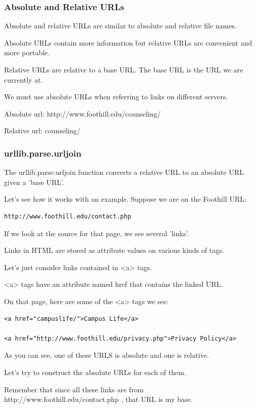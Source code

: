\documentclass{article}
\begin{document}
\subsubsection{Absolute and Relative URLs}
Absolute and relative URLs are similar to absolute and relative file names.

Absolute URLs contain more information but relative URLs are convenient and more portable.

Relative URLs are relative to a base URL.  The base URL is the URL we are currently at.

We must use absolute URLs when referring to links on different servers.

Absolute url: http://www.foothill.edu/counseling/

Relative url:  counseling/

\subsubsection{urllib.parse.urljoin}
The urllib.parse.urljoin  function converts a relative URL to an absolute URL given a 'base URL'.  

Let's see how it works with an example.  Suppose we are on the Foothill URL:

\begin{lstlisting}
http://www.foothill.edu/contact.php
\end{lstlisting}

If we look at the source for that page, we see several 'links'.

Links in HTML are stored as attribute values on various kinds of tags.

Let’s just consider links contained in <a> tags. 

<a> tags have an attribute named href that contains the linked URL.

On that page, here are some of the <a> tags we see:

\begin{lstlisting}
<a href="campuslife/">Campus Life</a>

<a href="http://www.foothill.edu/privacy.php">Privacy Policy</a>
\end{lstlisting}

As you can see, one of these URLS is absolute and one is relative.

Let’s try to construct the absolute URLs for each of them.  

Remember that since all these links are from http://www.foothill.edu/contact.php , that URL is my base.
\end{document}

